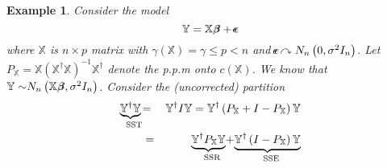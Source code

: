 \documentclass{article}
\newtheorem{example}[theorem]{Example}
\begin{document}
\setcounter{part}{1} \setcounter{page}{1}

\begin{example}
Consider the model%
\begin{equation*}
\mathbb{Y=X}%
\beta\mkern-9.6mu \beta%
+%
\epsilon\mkern-10mu \epsilon%
\end{equation*}%
where $\mathbb{X}$ is $n\times p$ matrix with $\gamma \left( \mathbb{X}%
\right) =\gamma \leq p<n$ and $%
\epsilon\mkern-10mu \epsilon%
\curvearrowright N_{n}\left( 0,\sigma ^{2}I_{n}\right) $. Let $P_{\mathbb{X}%
}=\mathbb{X}\left( \mathbb{X}^{\dagger }\mathbb{X}\right) ^{-1}\mathbb{X}%
^{\dagger }$ denote the p.p.m onto $c\left( \mathbb{X}\right) $. We know
that $\mathbb{Y\sim }N_{n}\left( \mathbb{X}%
\beta\mkern-9.6mu \beta%
,\sigma ^{2}I_{n}\right) $. Consider the (uncorrected) partition%
\begin{eqnarray*}
\underset{\text{SST}}{\underbrace{\mathbb{Y}^{\dagger }\mathbb{Y}}} &\mathbb{%
=}&\mathbb{Y}^{\dagger }I\mathbb{Y=Y}^{\dagger }\left( P_{\mathbb{X}}+I-P_{%
\mathbb{X}}\right) \mathbb{Y} \\
&=&\underset{\text{SSR}}{\underbrace{\mathbb{Y}^{\dagger }P_{\mathbb{X}}%
\mathbb{Y}}}\mathbb{+}\underset{\text{SSE}}{\underbrace{\mathbb{Y}^{\dagger
}\left( I-P_{\mathbb{X}}\right) \mathbb{Y}}}
\end{eqnarray*}


\end{example}
\end{document}
